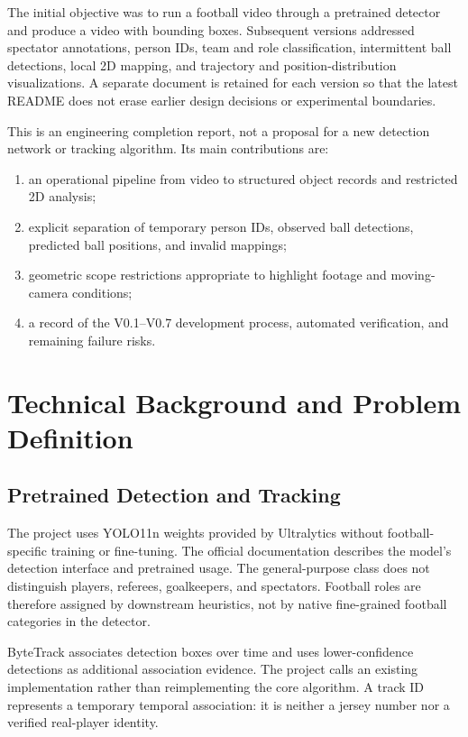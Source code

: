 \documentclass[11pt,a4paper]{article}
\newcommand{\code}[1]{\texttt{\detokenize{#1}}}
\begin{document}
The initial objective was to run a football video through a pretrained detector
and produce a video with bounding boxes. Subsequent versions addressed
spectator annotations, person IDs, team and role classification, intermittent
ball detections, local 2D mapping, and trajectory and position-distribution
visualizations. A separate document is retained for each version so that the
latest README does not erase earlier design decisions or experimental boundaries.

This is an engineering completion report, not a proposal for a new detection
network or tracking algorithm. Its main contributions are:
\begin{enumerate}
  \item an operational pipeline from video to structured object records and
        restricted 2D analysis;
  \item explicit separation of temporary person IDs, observed ball detections,
        predicted ball positions, and invalid mappings;
  \item geometric scope restrictions appropriate to highlight footage and
        moving-camera conditions;
  \item a record of the V0.1--V0.7 development process, automated verification,
        and remaining failure risks.
\end{enumerate}

\section{Technical Background and Problem Definition}

\subsection{Pretrained Detection and Tracking}

The project uses YOLO11n weights provided by Ultralytics without
football-specific training or fine-tuning. The official documentation describes
the model's detection interface and pretrained usage\cite{yolo11}.
The general-purpose \code{person} class does not distinguish players, referees,
goalkeepers, and spectators. Football roles are therefore assigned by downstream
heuristics, not by native fine-grained football categories in the detector.

ByteTrack associates detection boxes over time and uses lower-confidence
detections as additional association evidence\cite{bytetrack}.
The project calls an existing implementation rather than reimplementing the
core algorithm. A track ID represents a temporary temporal association:
it is neither a jersey number nor a verified real-player identity.
\end{document}

